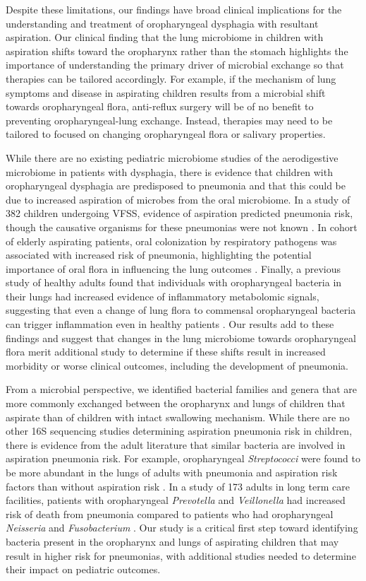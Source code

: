 Despite these limitations, our findings have broad clinical implications for the understanding and treatment of oropharyngeal dysphagia with resultant aspiration.
Our clinical finding that the lung microbiome in children with aspiration shifts toward the oropharynx rather than the stomach highlights the importance of understanding the primary driver of microbial exchange so that therapies can be tailored accordingly.
For example, if the mechanism of lung symptoms and disease in aspirating children results from a microbial shift towards oropharyngeal flora, anti-reflux surgery will be of no benefit to preventing oropharyngeal-lung exchange.
Instead, therapies may need to be tailored to focused on changing oropharyngeal flora or salivary properties.

While there are no existing pediatric microbiome studies of the aerodigestive microbiome in patients with dysphagia, there is evidence that children with oropharyngeal dysphagia are predisposed to pneumonia and that this could be due to increased aspiration of microbes from the oral microbiome.
In a study of 382 children undergoing VFSS, evidence of aspiration predicted pneumonia risk, though the causative organisms for these pneumonias were not known \cite{weir2007pneumoasp}.
In cohort of elderly aspirating patients, oral colonization by respiratory pathogens was associated with increased risk of pneumonia, highlighting the potential importance of oral flora in influencing the lung outcomes \cite{ortega2015oralpatho}.
Finally, a previous study of healthy adults found that individuals with oropharyngeal bacteria in their lungs had increased evidence of inflammatory metabolomic signals, suggesting that even a change of lung flora to commensal oropharyngeal bacteria can trigger inflammation even in healthy patients \cite{segal-2016-inflammation}.
Our results add to these findings and suggest that changes in the lung microbiome towards oropharyngeal flora merit additional study to determine if these shifts result in increased morbidity or worse clinical outcomes, including the development of pneumonia.

From a microbial perspective, we identified bacterial families and genera that are more commonly exchanged between the oropharynx and lungs of children that aspirate than of children with intact swallowing mechanism.
While there are no other 16S sequencing studies determining aspiration pneumonia risk in children, there is evidence from the adult literature that similar bacteria are involved in aspiration pneumonia risk.
For example, oropharyngeal \textit{Streptococci} were found to be more abundant in the lungs of adults with pneumonia and aspiration risk factors than without aspiration risk \cite{akata2016oralstrepto}.
In a study of 173 adults in long term care facilities, patients with oropharyngeal \textit{Prevotella} and \textit{Veillonella} had increased risk of death from pneumonia compared to patients who had oropharyngeal \textit{Neisseria} and \textit{Fusobacterium} \cite{kageyama2017pneumomortality}.
Our study is a critical first step toward identifying bacteria present in the oropharynx and lungs of aspirating children that may result in higher risk for pneumonias, with additional studies needed to determine their impact on pediatric outcomes.

